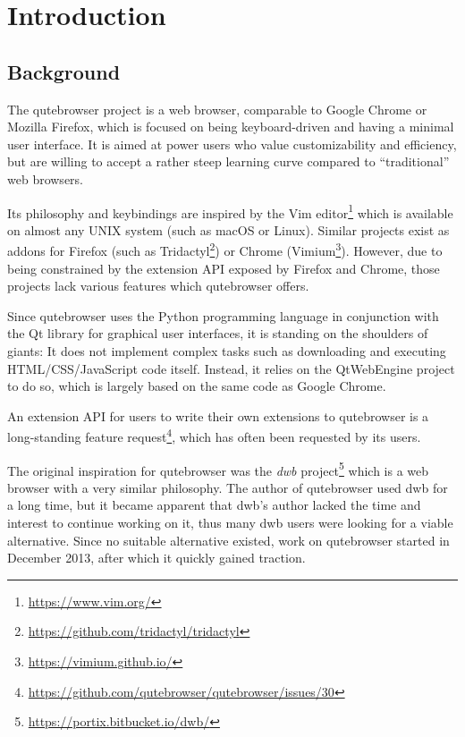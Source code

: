 
\chapter{Introduction}
\label{ch:intro}

\section{Background}

The qutebrowser project is a web browser, comparable to Google Chrome or Mozilla
Firefox, which is focused on being keyboard-driven and having a minimal user
interface. It is aimed at power users who value customizability and efficiency,
but are willing to accept a rather steep learning curve compared to
``traditional'' web browsers.

Its philosophy and keybindings are inspired by the Vim
editor\footnote{\url{https://www.vim.org/}} which is available on almost any
UNIX system (such as macOS or Linux). Similar projects exist as addons for
Firefox (such as Tridactyl\footnote{\url{https://github.com/tridactyl/tridactyl}})
or Chrome (Vimium\footnote{\url{https://vimium.github.io/}}). However, due to
being constrained by the extension API exposed by Firefox and Chrome, those
projects lack various features which qutebrowser offers.

Since qutebrowser uses the Python programming language in conjunction with the
Qt library for graphical user interfaces, it is standing on the shoulders of
giants: It does not implement complex tasks such as downloading and executing
HTML/CSS/JavaScript code itself. Instead, it relies on the QtWebEngine project
to do so, which is largely based on the same code as Google Chrome.

An extension API for users to write their own extensions to qutebrowser is a
long-standing feature
request\footnote{\url{https://github.com/qutebrowser/qutebrowser/issues/30}},
which has often been requested by its users.

The original inspiration for qutebrowser was the \emph{dwb}
project\footnote{\url{https://portix.bitbucket.io/dwb/}} which is a web browser
with a very similar philosophy. The author of qutebrowser used dwb for a long
time, but it became apparent that dwb's author lacked the time and interest to
continue working on it, thus many dwb users were looking for a viable
alternative. Since no suitable alternative existed, work on qutebrowser started
in December 2013, after which it quickly gained traction.

